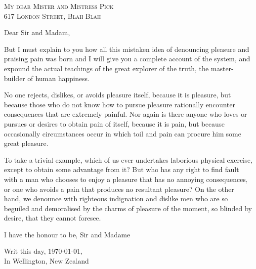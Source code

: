 \documentclass{lettear}
\date{\vspace*{-4em}}
\def\myopening{My dear Mister and Mistress Pick\\617 London Street, Blah Blah}
\def\myopeningtwo{Dear Sir and Madam}
\def\writaddress{Wellington, New Zealand}
\begin{document}
\begin{letter}{{\scshape\myopening}}%
\vspace*{-4em}
\opening{\hspace*{3em}\myopeningtwo,\emdash}
\phantom{\hspace*{3em}\myopeningtwo,\emdash}%
    But I must explain to you how all this mistaken idea of denouncing pleasure and praising pain was born and I will give you a complete account of the system, and expound the actual teachings of the great explorer of the truth, the master-builder of human happiness.

No one rejects, dislikes, or avoids pleasure itself, because it is pleasure, but because those who do not know how to pursue pleasure rationally encounter consequences that are extremely painful. Nor again is there anyone who loves or pursues or desires to obtain pain of itself, because it is pain, but because occasionally circumstances occur in which toil and pain can procure him some great pleasure.

To take a trivial example, which of us ever undertakes laborious physical exercise, except to obtain some advantage from it? But who has any right to find fault with a man who chooses to enjoy a pleasure that has no annoying consequences, or one who avoids a pain that produces no resultant pleasure? On the other hand, we denounce with righteous indignation and dislike men who are so beguiled and demoralised by the charms of pleasure of the moment, so blinded by desire, that they cannot foresee.

\closing{I have the honour to be, Sir and Madame}
\begin{flushright}\par\noindent Writ this day, \today,\\In \writaddress\end{flushright}
\end{letter}
\end{document}
